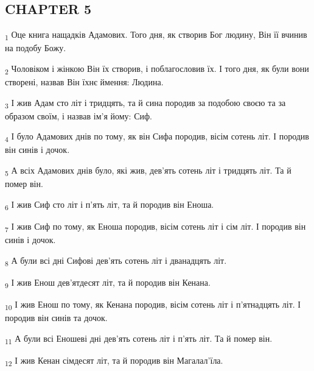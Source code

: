 \subsection{CHAPTER 5}
\begin{tcolorbox}
\textsubscript{1} Оце книга нащадків Адамових. Того дня, як створив Бог людину, Він її вчинив на подобу Божу.
\end{tcolorbox}
\begin{tcolorbox}
\textsubscript{2} Чоловіком і жінкою Він їх створив, і поблагословив їх. І того дня, як були вони створені, назвав Він їхнє ймення: Людина.
\end{tcolorbox}
\begin{tcolorbox}
\textsubscript{3} І жив Адам сто літ і тридцять, та й сина породив за подобою своєю та за образом своїм, і назвав ім'я йому: Сиф.
\end{tcolorbox}
\begin{tcolorbox}
\textsubscript{4} І було Адамових днів по тому, як він Сифа породив, вісім сотень літ. І породив він синів і дочок.
\end{tcolorbox}
\begin{tcolorbox}
\textsubscript{5} А всіх Адамових днів було, які жив, дев'ять сотень літ і тридцять літ. Та й помер він.
\end{tcolorbox}
\begin{tcolorbox}
\textsubscript{6} І жив Сиф сто літ і п'ять літ, та й породив він Еноша.
\end{tcolorbox}
\begin{tcolorbox}
\textsubscript{7} І жив Сиф по тому, як Еноша породив, вісім сотень літ і сім літ. І породив він синів і дочок.
\end{tcolorbox}
\begin{tcolorbox}
\textsubscript{8} А були всі дні Сифові дев'ять сотень літ і дванадцять літ.
\end{tcolorbox}
\begin{tcolorbox}
\textsubscript{9} І жив Енош дев'ятдесят літ, та й породив він Кенана.
\end{tcolorbox}
\begin{tcolorbox}
\textsubscript{10} І жив Енош по тому, як Кенана породив, вісім сотень літ і п'ятнадцять літ. І породив він синів та дочок.
\end{tcolorbox}
\begin{tcolorbox}
\textsubscript{11} А були всі Еношеві дні дев'ять сотень літ і п'ять літ. Та й помер він.
\end{tcolorbox}
\begin{tcolorbox}
\textsubscript{12} І жив Кенан сімдесят літ, та й породив він Магалал'їла.
\end{tcolorbox}
